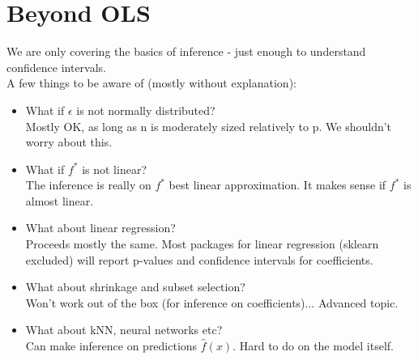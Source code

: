 \documentclass[a4paper]{article}
\begin{document}
\section*{Beyond OLS}
We are only covering the basics of inference - just enough to understand confidence intervals.\\
A few things to be aware of (mostly without explanation):\\
\begin{itemize}
	\item What if $\epsilon$ is not normally distributed?\\
    	Mostly OK, as long as n is moderately sized relatively to p.
        We shouldn't worry about this.
    \item What if $f^*$ is not linear?\\
       The inference is really on $f^*$ best linear approximation. It makes sense if $f^*$ is almost linear.
    \item What about linear regression?\\
       Proceeds mostly the same. Most packages for linear regression (sklearn excluded) will report p-values and confidence 			intervals for coefficients.
    \item What about shrinkage and subset selection?\\
    	Won't work out of the box (for inference on coefficients)... Advanced topic.
    \item What about kNN, neural networks etc?\\
    	Can make inference on predictions $\widehat{f}(x)$. Hard to do on the model itself.
\end{itemize}
\end{document}

